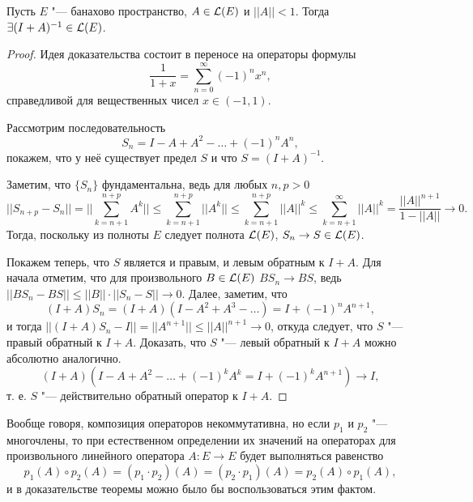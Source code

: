 \documentclass[main]{subfiles}
\begin{document}
\begin{theorem}\label{thm:inverse-neumann} %
  Пусть \( E \) "--- банахово пространство,
  \( A \in \Linears{E} \) и \( ||A|| < 1 \).
  Тогда \( \exists (I + A)^{-1} \in \Linears{E} \).
\end{theorem}
\begin{proof}
  Идея доказательства состоит
  в переносе на операторы формулы
  \[
    \frac{1}{1 + x} = \sum_{n=0}^\infty {(-1)}^n x^n,
  \]
  справедливой для вещественных чисел \( x \in (-1, 1) \).

  Рассмотрим последовательность
  \[
    S_n = I - A + A^2 - \ldots + {(-1)}^n A^n,
  \]
  покажем, что у неё существует предел \( S \)
  и что \( S = {(I + A)}^{-1} \).

  Заметим, что \( \{ S_n \} \) фундаментальна,
  ведь для любых \( n, p > 0 \)
  \[
    ||S_{n + p} - S_n|| =
    ||\sum_{k = n + 1}^{n + p} A^k|| \le
    \sum_{k = n + 1}^{n + p} ||A^k|| \le
    \sum_{k = n + 1}^{n + p} ||A||^k \le
    \sum_{k = n + 1}^{\infty} ||A||^k =
    \frac{||A||^{n+1}}{1 - ||A||}  \to 0.
  \]
  Тогда, поскольку из полноты \( E \) следует
  полнота \( \Linears{E} \),
  \( S_n \to S \in \Linears{E} \).

  Покажем теперь, что \( S \)
  является и правым, и левым обратным к \( I + A \).
  Для начала отметим, что для произвольного
  \( B \in \Linears{E} \) \( B S_n \to B S \),
  ведь \( ||B S_n - B S|| \le ||B|| \cdot ||S_n - S|| \to 0 \).
  Далее, заметим, что
  \[
    (I + A) S_n = (I + A)(I - A^2 + A^3 - \ldots) =
    I + {(-1)}^n A^{n+1},
  \]
  и тогда \( ||(I + A) S_n - I|| = ||A^{n+1}|| \le ||A||^{n+1} \to 0 \),
  откуда следует, что \( S \) "--- правый обратный к \( I + A \).
  Доказать, что \( S \) "--- левый обратный к \( I + A \)
  можно абсолютно аналогично.
  \[ (I + A)(I - A + A^2 - \dots + (-1)^k A^k =
  I + (-1)^k A^{n + 1}) \to I, \]
  т. е. \( S \) "--- действительно обратный оператор к \( I + A \).
\end{proof}
\begin{remark}
  Вообще говоря, композиция операторов
  некоммутативна,
  но если \( p_1 \) и \( p_2 \) "--- многочлены,
  то при естественном определении их значений
  на операторах для произвольного
  линейного оператора \( A : E \to E \) будет выполняться
  равенство
  \[
    p_1(A) \circ p_2(A) = (p_1 \cdot p_2)(A) =
    (p_2 \cdot p_1)(A) = p_2(A) \circ p_1(A),
  \]
  и в доказательстве теоремы можно
  было бы воспользоваться этим фактом.
\end{remark}
\end{document}
